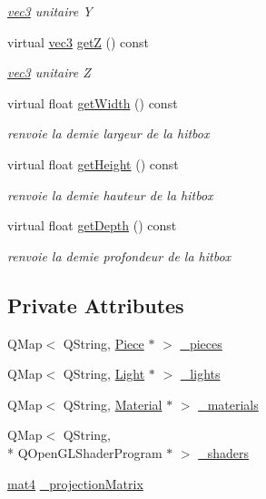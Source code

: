 \begin{DoxyCompactItemize}
\begin{DoxyCompactList}\small\item\em \hyperlink{structvec3}{vec3} unitaire Y \end{DoxyCompactList}\item 
virtual \hyperlink{structvec3}{vec3} \hyperlink{class_scene_a4762ba0c1a51eeba4a19a515b546b6bd}{get\+Z} () const 
\begin{DoxyCompactList}\small\item\em \hyperlink{structvec3}{vec3} unitaire Z \end{DoxyCompactList}\item 
virtual float \hyperlink{class_scene_a3fa3346da04b7aa00cb5a30171e70a24}{get\+Width} () const 
\begin{DoxyCompactList}\small\item\em renvoie la demie largeur de la hitbox \end{DoxyCompactList}\item 
virtual float \hyperlink{class_scene_a83026eeb7ec401111634beb553cb2f8e}{get\+Height} () const 
\begin{DoxyCompactList}\small\item\em renvoie la demie hauteur de la hitbox \end{DoxyCompactList}\item 
virtual float \hyperlink{class_scene_a96b58a841f6295813072d258aa9a9236}{get\+Depth} () const 
\begin{DoxyCompactList}\small\item\em renvoie la demie profondeur de la hitbox \end{DoxyCompactList}\end{DoxyCompactItemize}
\subsection*{Private Attributes}
\begin{DoxyCompactItemize}
\item 
Q\+Map$<$ Q\+String, \hyperlink{class_piece}{Piece} $\ast$ $>$ \hyperlink{class_scene_aa3a488d4be41fe6a187488e1e7a1035c}{\+\_\+pieces}
\item 
Q\+Map$<$ Q\+String, \hyperlink{class_light}{Light} $\ast$ $>$ \hyperlink{class_scene_a0ef33120973d6afc1754d2154d7c338a}{\+\_\+lights}
\item 
Q\+Map$<$ Q\+String, \hyperlink{class_material}{Material} $\ast$ $>$ \hyperlink{class_scene_a5b96810fdeb47632d5ce6c2c47f41691}{\+\_\+materials}
\item 
Q\+Map$<$ Q\+String, \\*
Q\+Open\+G\+L\+Shader\+Program $\ast$ $>$ \hyperlink{class_scene_abde34dc03c8d3a07b3177041ab195f07}{\+\_\+shaders}
\item 
\hyperlink{structmat4}{mat4} \hyperlink{class_scene_a7db3394191c0a07e6bdc456a53ac8ece}{\+\_\+projection\+Matrix}
\end{DoxyCompactItemize}
